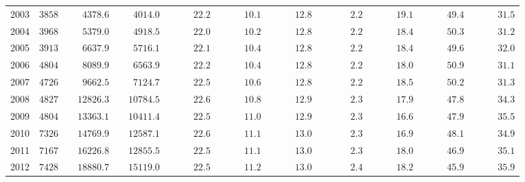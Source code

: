 \documentclass[alpha-refs]{wiley-article-01g}
\begin{document}
\begin{table}[htbp!]
{\begin{tabular}{lcccccccccc}
			2003  & $3858$ & $\phantom{000}4378.6$ & $\phantom{000}4014.0$ & $\phantom{00000}22.2$ & $\phantom{00000}10.1$ & $\phantom{00000}12.8$ & $\phantom{000000}2.2$ & $\phantom{00000}19.1$ & $\phantom{00000}49.4$ & $\phantom{00000}31.5$ \\
			2004  & $3968$ & $\phantom{000}5379.0$ & $\phantom{000}4918.5$ & $\phantom{00000}22.0$ & $\phantom{00000}10.2$ & $\phantom{00000}12.8$ & $\phantom{000000}2.2$ & $\phantom{00000}18.4$ & $\phantom{00000}50.3$ & $\phantom{00000}31.2$ \\
			2005  & $3913$ & $\phantom{000}6637.9$ & $\phantom{000}5716.1$ & $\phantom{00000}22.1$ & $\phantom{00000}10.4$ & $\phantom{00000}12.8$ & $\phantom{000000}2.2$ & $\phantom{00000}18.4$ & $\phantom{00000}49.6$ & $\phantom{00000}32.0$ \\
			2006  & $4804$ & $\phantom{000}8089.9$ & $\phantom{000}6563.9$ & $\phantom{00000}22.2$ & $\phantom{00000}10.4$ & $\phantom{00000}12.8$ & $\phantom{000000}2.2$ & $\phantom{00000}18.0$ & $\phantom{00000}50.9$ & $\phantom{00000}31.1$ \\
			2007  & $4726$ & $\phantom{000}9662.5$ & $\phantom{000}7124.7$ & $\phantom{00000}22.5$ & $\phantom{00000}10.6$ & $\phantom{00000}12.8$ & $\phantom{000000}2.2$ & $\phantom{00000}18.5$ & $\phantom{00000}50.2$ & $\phantom{00000}31.3$ \\
			2008  & $4827$ & $\phantom{00}12826.3$ & $\phantom{00}10784.5$ & $\phantom{00000}22.6$ & $\phantom{00000}10.8$ & $\phantom{00000}12.9$ & $\phantom{000000}2.3$ & $\phantom{00000}17.9$ & $\phantom{00000}47.8$ & $\phantom{00000}34.3$ \\
			2009  & $4804$ & $\phantom{00}13363.1$ & $\phantom{00}10411.4$ & $\phantom{00000}22.5$ & $\phantom{00000}11.0$ & $\phantom{00000}12.9$ & $\phantom{000000}2.3$ & $\phantom{00000}16.6$ & $\phantom{00000}47.9$ & $\phantom{00000}35.5$ \\
			2010  & $7326$ & $\phantom{00}14769.9$ & $\phantom{00}12587.1$ & $\phantom{00000}22.6$ & $\phantom{00000}11.1$ & $\phantom{00000}13.0$ & $\phantom{000000}2.3$ & $\phantom{00000}16.9$ & $\phantom{00000}48.1$ & $\phantom{00000}34.9$ \\
			2011  & $7167$ & $\phantom{00}16226.8$ & $\phantom{00}12855.5$ & $\phantom{00000}22.5$ & $\phantom{00000}11.1$ & $\phantom{00000}13.0$ & $\phantom{000000}2.3$ & $\phantom{00000}18.0$ & $\phantom{00000}46.9$ & $\phantom{00000}35.1$ \\
			2012  & $7428$ & $\phantom{00}18880.7$ & $\phantom{00}15119.0$ & $\phantom{00000}22.5$ & $\phantom{00000}11.2$ & $\phantom{00000}13.0$ & $\phantom{000000}2.4$ & $\phantom{00000}18.2$ & $\phantom{00000}45.9$ & $\phantom{00000}35.9$ \\

\end{tabular}}
\end{table}
\end{document}
